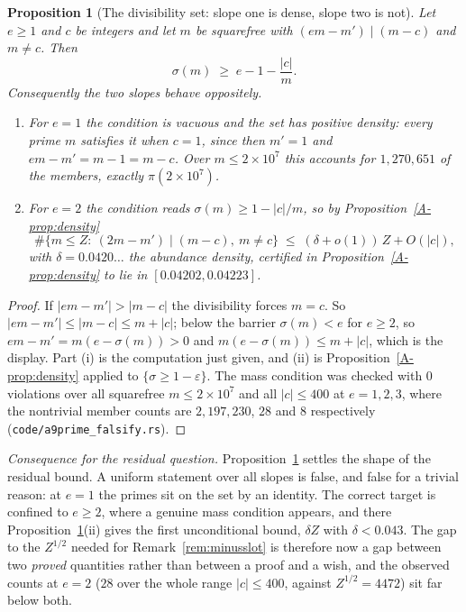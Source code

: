 \documentclass[11pt]{article}
\newtheorem{proposition}[theorem]{Proposition}
\theoremstyle{definition}
\begin{document}
\begin{proposition}[The divisibility set: slope one is dense, slope two is not]\label{prop:divset}
Let $e\ge1$ and $c$ be integers and let $m$ be squarefree with
$(em-m')\mid(m-c)$ and $m\neq c$. Then
\[ \sigma(m)\;\ge\;e-1-\frac{|c|}{m}. \]
Consequently the two slopes behave oppositely.
\begin{enumerate}[label=\textup{(\roman*)},leftmargin=2.2em]
\item For $e=1$ the condition is vacuous and the set has positive density: every prime $m$ satisfies
it when $c=1$, since then $m'=1$ and $em-m'=m-1=m-c$. Over $m\le2\times10^7$ this accounts for
$1{,}270{,}651$ of the members, exactly $\pi(2\times10^7)$.
\item For $e=2$ the condition reads $\sigma(m)\ge1-|c|/m$, so by Proposition~\ref{A-prop:density}
\[ \#\{m\le Z:\ (2m-m')\mid(m-c),\ m\neq c\}\;\le\;(\delta+o(1))\,Z+O(|c|), \]
with $\delta=0.0420\ldots$ the abundance density, certified in Proposition~\ref{A-prop:density} to lie
in $[0.04202,0.04223]$.
\end{enumerate}
\end{proposition}
\begin{proof}
If $|em-m'|>|m-c|$ the divisibility forces $m=c$. So $|em-m'|\le|m-c|\le m+|c|$; below the barrier
$\sigma(m)<e$ for $e\ge2$, so $em-m'=m(e-\sigma(m))>0$ and $m(e-\sigma(m))\le m+|c|$, which is the
display. Part (i) is the computation just given, and (ii) is Proposition~\ref{A-prop:density} applied
to $\{\sigma\ge1-\varepsilon\}$. The mass condition was checked with $0$ violations over all
squarefree $m\le2\times10^7$ and all $|c|\le400$ at $e=1,2,3$, where the nontrivial member counts are
$2{,}197{,}230$, $28$ and $8$ respectively (\texttt{code/a9prime\_falsify.rs}).
\end{proof}

\emph{Consequence for the residual question.} Proposition~\ref{prop:divset} settles the shape of the residual bound. A uniform statement over all
slopes is false, and false for a trivial reason: at $e=1$ the primes sit on the set by an identity.
The correct target is confined to $e\ge2$, where a genuine mass condition appears, and there
Proposition~\ref{prop:divset}(ii) gives the first unconditional bound, $\delta Z$ with
$\delta<0.043$. The gap to the $Z^{1/2}$ needed for Remark~\ref{rem:minusslot} is therefore now a
gap between two \emph{proved} quantities rather than between a proof and a wish, and the observed
counts at $e=2$ ($28$ over the whole range $|c|\le400$, against $Z^{1/2}=4472$) sit far below both.
\end{document}
